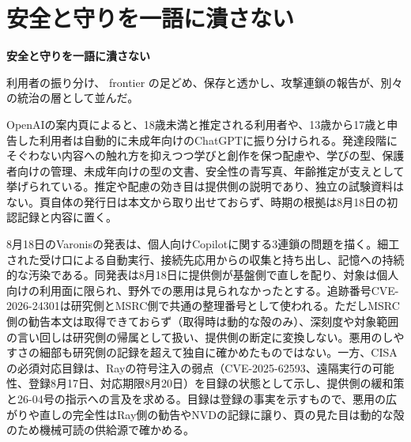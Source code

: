 \section{安全と守りを一語に潰さない}
\begin{wideflow}
{\Large\bfseries 安全と守りを一語に潰さない}\par
\smallskip
{\color{SurveyMuted}利用者の振り分け、 frontier の足どめ、保存と透かし、攻撃連鎖の報告が、別々の統治の層として並んだ。}\par
\end{wideflow}

\noindent OpenAIの案内頁によると、18歳未満と推定される利用者や、13歳から17歳と申告した利用者は自動的に未成年向けのChatGPTに振り分けられる。発達段階にそぐわない内容への触れ方を抑えつつ学びと創作を保つ配慮や、学びの型、保護者向けの管理、未成年向けの型の文書、安全性の青写真、年齢推定が支えとして挙げられている。推定や配慮の効き目は提供側の説明であり、独立の試験資料はない。頁自体の発行日は本文から取り出せておらず、時期の根拠は8月18日の初認記録と内容に置く。 \cite{w2026w34w34eventc004}\par\medskip

\noindent 8月18日のVaronisの発表は、個人向けCopilotに関する3連鎖の問題を描く。細工された受け口による自動実行、接続先応用からの収集と持ち出し、記憶への持続的な汚染である。同発表は8月18日に提供側が基盤側で直しを配り、対象は個人向けの利用面に限られ、野外での悪用は見られなかったとする。追跡番号CVE-2026-24301は研究側とMSRC側で共通の整理番号として使われる。ただしMSRC側の勧告本文は取得できておらず（取得時は動的な殻のみ）、深刻度や対象範囲の言い回しは研究側の帰属として扱い、提供側の断定に変換しない。悪用のしやすさの細部も研究側の記録を超えて独自に確かめたものではない。一方、CISAの必須対応目録は、Rayの符号注入の弱点（CVE-2025-62593、遠隔実行の可能性、登録8月17日、対応期限8月20日）を目録の状態として示し、提供側の緩和策と26-04号の指示への言及を求める。目録は登録の事実を示すもので、悪用の広がりや直しの完全性はRay側の勧告やNVDの記録に譲り、頁の見た目は動的な殻のため機械可読の供給源で確かめる。 \cite{w2026w34w34eventc055,w2026w34w34eventc006}\par\medskip


